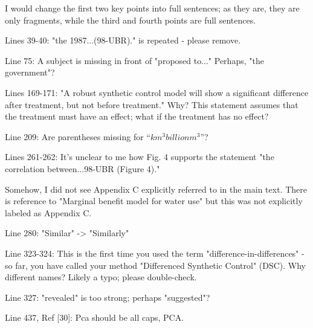 \RC{} I would change the first two key points into full sentences; as they are, they are only fragments, while the third and fourth points are full sentences.

\RC{} Lines 39-40: "the 1987...(98-UBR)." is repeated - please remove.

\RC{} Line 75: A subject is missing in front of "proposed to..." Perhaps, "the government"?

\RC{} Lines 169-171: "A robust synthetic control model will show a significant difference after treatment, but not before treatment." Why? This statement assumes that the treatment must have an effect; what if the treatment has no effect?

\RC{} Line 209: Are parentheses missing for ``$km^3 billion m^3$''?

\RC{} Lines 261-262: It's unclear to me how Fig. 4 supports the statement "the correlation between...98-UBR (Figure 4)."

\RC{} Somehow, I did not see Appendix C explicitly referred to in the main text. There is reference to "Marginal benefit model for water use" but this was not explicitly labeled as Appendix C.

\RC{} Line 280: "Similar" -> "Similarly"

\RC{} Line 323-324: This is the first time you used the term "difference-in-differences" - so far, you have called your method "Differenced Synthetic Control" (DSC). Why different names? Likely a typo; please double-check.

\RC{} Line 327: "revealed" is too strong; perhaps "suggested"?

\RC{} Line 437, Ref [30]: Pca should be all caps, PCA.\

